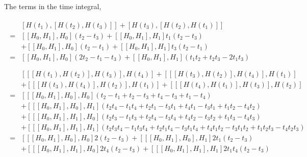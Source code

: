 \documentclass[10pt,fleqn]{article}
\newcommand{\eqar}[1]
{
  \begin{align}
    #1
  \end{align}
}
\newcommand{\paren}[1]{{\left({#1}\right)}}
\newcommand{\sqr}[1]{{\left[{#1}\right]}}
\begin{document}
The terms in the time integral,
\eqar{
  \begin{split}
    &\sqr{H(t_1),\sqr{H(t_2),H(t_3)}}+\sqr{H(t_3),\sqr{H(t_2),H(t_1)}}\\
    =&\sqr{\sqr{H_0,H_1},H_0}\paren{t_2-t_3}+\sqr{\sqr{H_0,H_1},H_1} t_1\paren{t_2-t_3}\\
    &+\sqr{\sqr{H_0,H_1},H_0}\paren{t_2-t_1}+\sqr{\sqr{H_0,H_1},H_1} t_3\paren{t_2-t_1}\\
    =&\sqr{\sqr{H_0,H_1},H_0}\paren{2t_2-t_1-t_3}+\sqr{\sqr{H_0,H_1},H_1}\paren{t_1t_2+t_2t_3-2t_1t_3}\\
  \end{split}\\
  \begin{split}
    &\sqr{\sqr{\sqr{H(t_1),H(t_2)},H(t_3)},H(t_4)}+\sqr{\sqr{\sqr{H(t_3),H(t_2)},H(t_4)},H(t_1)}\\
    &+\sqr{\sqr{\sqr{H(t_3),H(t_4)},H(t_2)},H(t_1)}+\sqr{\sqr{\sqr{H(t_4),H(t_1)},H(t_3)},H(t_2)}\\
    =&\sqr{\sqr{\sqr{H_0,H_1},H_0},H_0}\paren{t_2-t_1+t_2-t_3+t_4-t_3+t_1-t_4}\\
    &+\sqr{\sqr{\sqr{H_0,H_1},H_0},H_1}\paren{t_2 t_4-t_1 t_4+t_2t_1-t_3t_1+t_4t_1-t_3t_1+t_1t_2-t_4t_2}\\
    &+\sqr{\sqr{\sqr{H_0,H_1},H_1},H_0}\paren{t_2t_3-t_1t_3+t_2t_4-t_3t_4+t_4t_2-t_3t_2+t_1t_3-t_4t_3}\\
    &+\sqr{\sqr{\sqr{H_0,H_1},H_1},H_1}\paren{t_2t_3t_4-t_1t_3t_4
      +t_2t_1t_4-t_3t_1t_4+t_4t_1t_2-t_3t_1t_2+t_1t_2t_3-t_4t_2t_3}\\
    =&\sqr{\sqr{\sqr{H_0,H_1},H_0},H_0}2\paren{t_2-t_3}+\sqr{\sqr{\sqr{H_0,H_1},H_0},H_1}2t_1\paren{t_2-t_3}\\
    &+\sqr{\sqr{\sqr{H_0,H_1},H_1},H_0}2t_4\paren{t_2-t_3}+\sqr{\sqr{\sqr{H_0,H_1},H_1},H_1}2t_1t_4\paren{t_2-t_3}\\
  \end{split}
}
\end{document}
